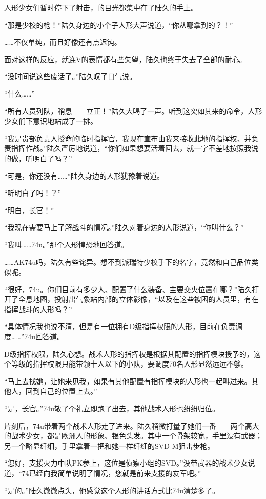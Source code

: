 人形少女们暂时停下了射击，的目光都集中在了陆久的手上。

“那是少校的枪！”陆久身边的小个子人形大声说道，“你从哪拿到的？！”

……不仅单纯，而且好像还有点迟钝。

面对这样的反应，就连V的表情都有些失望，陆久也终于失去了全部的耐心。

“没时间说这些废话了。”陆久叹了口气说。

“什么……”

“所有人员列队，稍息——立正！”陆久大喝了一声。听到这突如其来的命令，人形少女们下意识地站成了一排。

“我是贵部负责人授命的临时指挥官，我现在宣布由我来接收此地的指挥权、并负责指挥作战。”陆久严厉地说道，“你们如果想要活着回去，就一字不差地按照我说的做，听明白了吗？”

“可是，你还没有……”陆久身边的人形犹豫着说道。

“听明白了吗！？”

“明白，长官！”

“我现在需要马上了解战斗的情况。”陆久对着身边的人形说道，“你叫什么？”

“我叫……74u。”那个人形惶恐地回答道。

……AK74u吗，陆久有些诧异。想不到派瑞特少校手下的名字，竟然和自己品位类似呢。

“很好，74u。你们目前有多少人、配置了什么装备、主要交火位置在哪？”陆久打开了全息地图，投射出气象站内部的立体影像，“以及在这些被困的人员里，有在指挥战斗的人形吗？”

“具体情况我也说不清，但是有一位拥有D级指挥权限的人形，目前在负责调度……”74u回答道。

D级指挥权限，陆久心想。战术人形的指挥权是根据其配置的指挥模块授予的，这个等级的指挥权限只能带领十人以下的小队，要调度70名人形显然远远不够。

“马上去找她，让她来见我，如果有其他配置有指挥模块的人形也一起叫过来。其他人，回到自己的位置上去。”

“是，长官。”74u敬了个礼立即跑了出去，其他战术人形也纷纷归位。

片刻后，74u带着两个战术人形走了进来。陆久稍微打量了她们一番——两个高大的战术少女，都是欧洲人的形象、银色头发。其中一个骨架较宽，手里没有武器；另一个略显纤细，手里拿着一把和她一样纤细的SVD-M狙击步枪。

“您好，支援火力中队PK参上，这位是侦察小组的SVD。”没带武器的战术少女说道，“74已经向我简单说明了情况，您就是前来支援的友军吧。”

“是的。”陆久微微点头，他感觉这个人形的讲话方式比74u清楚多了。

